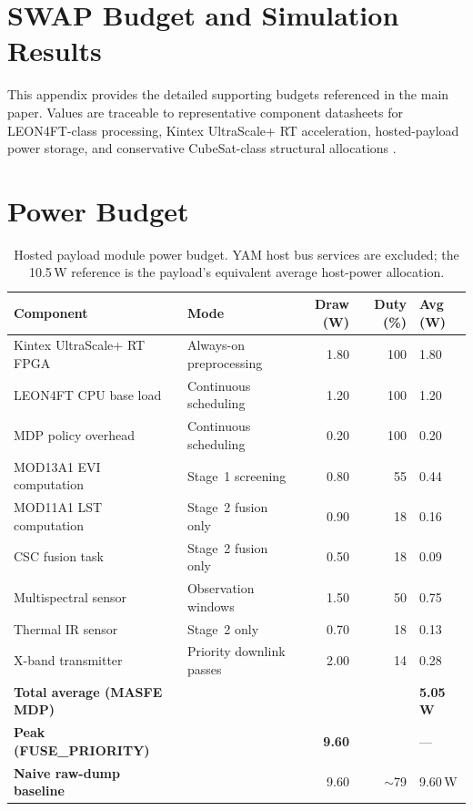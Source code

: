\section{SWAP Budget and Simulation Results}
\label{appendix:swap}

This appendix provides the detailed supporting budgets referenced in the main paper. Values are traceable to representative component datasheets for LEON4FT-class processing, Kintex UltraScale+ RT acceleration, hosted-payload power storage, and conservative CubeSat-class structural allocations \cite{cubesat-spec}.

\section*{Power Budget}

\begin{table}[htb]
  \centering
  \caption{Hosted payload module power budget. YAM host bus services are excluded; the 10.5\,W reference is the payload's equivalent average host-power allocation.}
  \small
  \begin{tabularx}{\textwidth}{p{4.0cm}p{3.5cm}rrX}
    \toprule
    \textbf{Component} & \textbf{Mode} & \textbf{Draw (W)} & \textbf{Duty (\%)} & \textbf{Avg (W)} \\
    \midrule
    Kintex UltraScale+ RT FPGA & Always-on preprocessing    & 1.80 & 100 & 1.80 \\
    LEON4FT CPU base load      & Continuous scheduling      & 1.20 & 100 & 1.20 \\
    MDP policy overhead        & Continuous scheduling      & 0.20 & 100 & 0.20 \\
    MOD13A1 EVI computation    & Stage~1 screening           & 0.80 &  55 & 0.44 \\
    MOD11A1 LST computation    & Stage~2 fusion only         & 0.90 &  18 & 0.16 \\
    CSC fusion task            & Stage~2 fusion only         & 0.50 &  18 & 0.09 \\
    Multispectral sensor       & Observation windows         & 1.50 &  50 & 0.75 \\
    Thermal IR sensor          & Stage~2 only                & 0.70 &  18 & 0.13 \\
    X-band transmitter         & Priority downlink passes    & 2.00 &  14 & 0.28 \\
    \midrule
    \textbf{Total average (MASFE MDP)} & & & & \textbf{5.05\,W} \\
    \textbf{Peak (FUSE\_PRIORITY)}     & & \textbf{9.60} & & --- \\
    \textbf{Naive raw-dump baseline}   & & 9.60 & $\sim$79 & 9.60\,W \\
    \bottomrule
  \end{tabularx}
\end{table}

